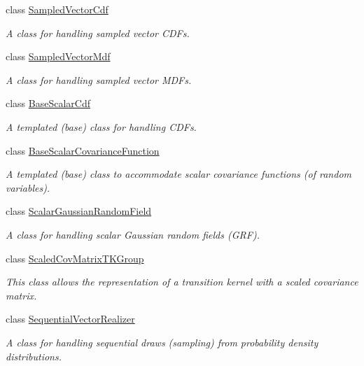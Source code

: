 \begin{DoxyCompactItemize}
class \hyperlink{class_q_u_e_s_o_1_1_sampled_vector_cdf}{Sampled\-Vector\-Cdf}
\begin{DoxyCompactList}\small\item\em A class for handling sampled vector C\-D\-Fs. \end{DoxyCompactList}\item 
class \hyperlink{class_q_u_e_s_o_1_1_sampled_vector_mdf}{Sampled\-Vector\-Mdf}
\begin{DoxyCompactList}\small\item\em A class for handling sampled vector M\-D\-Fs. \end{DoxyCompactList}\item 
class \hyperlink{class_q_u_e_s_o_1_1_base_scalar_cdf}{Base\-Scalar\-Cdf}
\begin{DoxyCompactList}\small\item\em A templated (base) class for handling C\-D\-Fs. \end{DoxyCompactList}\item 
class \hyperlink{class_q_u_e_s_o_1_1_base_scalar_covariance_function}{Base\-Scalar\-Covariance\-Function}
\begin{DoxyCompactList}\small\item\em A templated (base) class to accommodate scalar covariance functions (of random variables). \end{DoxyCompactList}\item 
class \hyperlink{class_q_u_e_s_o_1_1_scalar_gaussian_random_field}{Scalar\-Gaussian\-Random\-Field}
\begin{DoxyCompactList}\small\item\em A class for handling scalar Gaussian random fields (G\-R\-F). \end{DoxyCompactList}\item 
class \hyperlink{class_q_u_e_s_o_1_1_scaled_cov_matrix_t_k_group}{Scaled\-Cov\-Matrix\-T\-K\-Group}
\begin{DoxyCompactList}\small\item\em This class allows the representation of a transition kernel with a scaled covariance matrix. \end{DoxyCompactList}\item 
class \hyperlink{class_q_u_e_s_o_1_1_sequential_vector_realizer}{Sequential\-Vector\-Realizer}
\begin{DoxyCompactList}\small\item\em A class for handling sequential draws (sampling) from probability density distributions. \end{DoxyCompactList}\item 

\end{DoxyCompactItemize}
